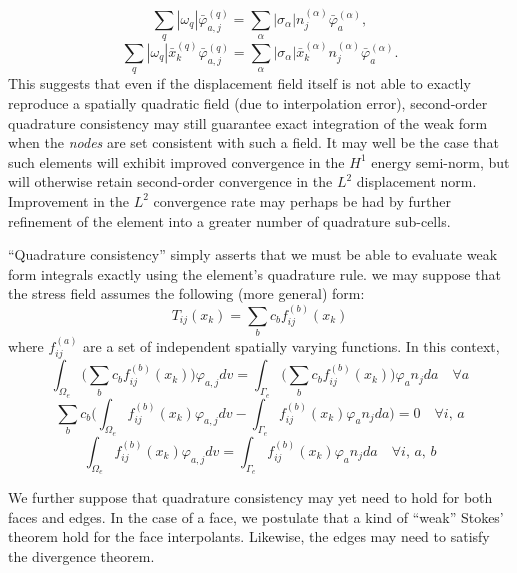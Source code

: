 \documentclass[11pt]{article} %
\begin{document}
\begin{equation}
	\sum_{q} | \omega_q | \bar{\varphi}_{a,j}^{(q)} = \sum_{\alpha} | \sigma_{\alpha} | n_j^{(\alpha)} \bar{\varphi}_a^{(\alpha)},
\end{equation}
\begin{equation}
	\sum_{q} | \omega_q | \bar{x}_k^{(q)} \bar{\varphi}_{a,j}^{(q)} = \sum_{\alpha} | \sigma_{\alpha} | \bar{x}_k^{(\alpha)} n_j^{(\alpha)} \bar{\varphi}_a^{(\alpha)}.
\end{equation}
This suggests that even if the displacement field itself is not able to exactly reproduce a spatially quadratic field (due to interpolation error), second-order quadrature consistency may still guarantee exact integration of the weak form when the \textit{nodes} are set consistent with such a field. It may well be the case that such elements will exhibit improved convergence in the $H^1$ energy semi-norm, but will otherwise retain second-order convergence in the $L^2$ displacement norm. Improvement in the $L^2$ convergence rate may perhaps be had by further refinement of the element into a greater number of quadrature sub-cells.

``Quadrature consistency'' simply asserts that we must be able to evaluate weak form integrals exactly using the element's quadrature rule.  we may suppose that the stress field assumes the following (more general) form:
\begin{equation}
	T_{ij} (x_k) = \sum_b c_b f^{(b)}_{ij} ( x_k )
\end{equation}
where $f^{(a)}_{ij}$ are a set of independent spatially varying functions. In this context,
\begin{equation}
	\int_{\Omega_e} \bigg( \sum_b c_b f^{(b)}_{ij} ( x_k ) \bigg) \varphi_{a,j} dv = \int_{\Gamma_e} \bigg( \sum_b c_b f^{(b)}_{ij} ( x_k ) \bigg) \varphi_a n_j da \quad \forall a
\end{equation}
\begin{equation}
	\sum_b c_b \bigg( \int_{\Omega_e} f^{(b)}_{ij} ( x_k ) \varphi_{a,j} dv - \int_{\Gamma_e} f^{(b)}_{ij} ( x_k ) \varphi_a n_j da \bigg) = 0 \quad \forall i, \, a
\end{equation}
\begin{equation}
	\int_{\Omega_e} f^{(b)}_{ij} ( x_k ) \varphi_{a,j} dv = \int_{\Gamma_e} f^{(b)}_{ij} ( x_k ) \varphi_a n_j da \quad \forall i, \, a, \, b
\end{equation}

We further suppose that quadrature consistency may yet need to hold for both faces and edges. In the case of a face, we postulate that a kind of ``weak'' Stokes' theorem hold for the face interpolants. Likewise, the edges may need to satisfy the divergence theorem.
\end{document}

